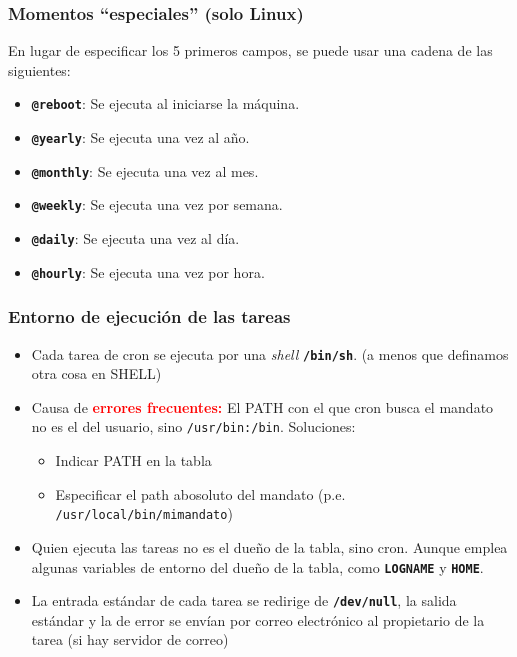 \documentclass[ucs]{beamer}
\begin{document}

\begin{frame}[fragile]

  \frametitle{Momentos ``especiales'' (solo Linux)}

  En lugar de especificar los 5 primeros campos, se puede usar
  una cadena de las siguientes:
  \begin{itemize}
  \item \texttt{\textbf{@reboot}}: Se ejecuta al iniciarse la máquina.
  \item \texttt{\textbf{@yearly}}: Se ejecuta una vez al año.
  \item \texttt{\textbf{@monthly}}: Se ejecuta una vez al mes.
  \item \texttt{\textbf{@weekly}}: Se ejecuta una vez por semana.
  \item \texttt{\textbf{@daily}}: Se ejecuta una vez al día.
  \item \texttt{\textbf{@hourly}}: Se ejecuta una vez por hora.
  \end{itemize}
\end{frame}


\begin{frame}[fragile]
  \frametitle{Entorno de ejecución de las tareas}
  \begin{itemize}
  \item Cada tarea de cron se ejecuta por una \emph{shell}
 \texttt{\textbf{/bin/sh}}. (a menos que definamos otra cosa en SHELL)
  \item Causa de
\textbf{\textcolor{red}{errores frecuentes:}}
 El PATH con el que cron busca
 el mandato no es el del usuario, sino \verb|/usr/bin:/bin|. Soluciones:

\begin{itemize}
\item Indicar PATH en la tabla
\item Especificar el path abosoluto del mandato (p.e. \verb|/usr/local/bin/mimandato|)
\end{itemize}

  \item
Quien ejecuta las tareas no es el dueño de la tabla, sino cron.
Aunque emplea algunas variables de entorno del dueño
de la tabla, como
    \texttt{\textbf{LOGNAME}} y
    \texttt{\textbf{HOME}}.
  
  \item La entrada estándar de cada tarea se redirige de
    \texttt{\textbf{/dev/null}}, la salida estándar y la de error se
    envían por correo electrónico al propietario de la tarea (si 
hay servidor de correo)
  \end{itemize}
\end{frame}
\end{document}
